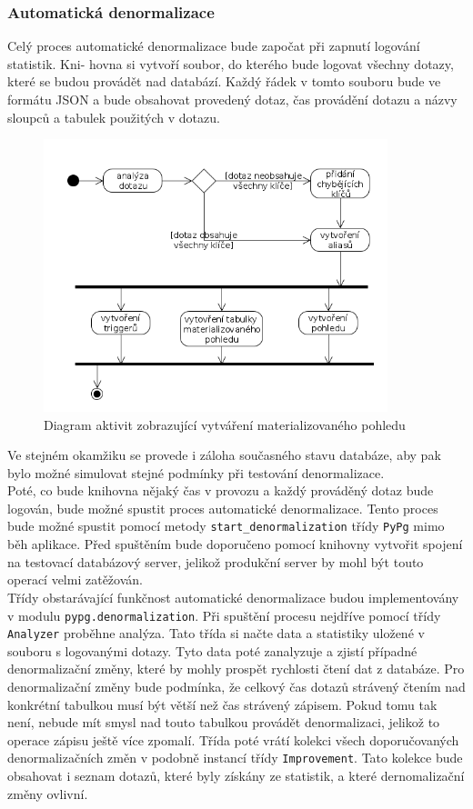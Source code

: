 \documentclass[ing,male,java,dept456]{diploma}						%
\begin{document}
\subsubsection{Automatická denormalizace}

Celý proces automatické denormalizace bude započat při zapnutí logování statistik. Kni- hovna si vytvoří soubor, do kterého bude logovat všechny dotazy, které se budou provádět nad databází. Každý řádek v tomto souboru bude ve formátu JSON a bude obsahovat provedený dotaz, čas provádění dotazu a názvy sloupců a tabulek použitých v dotazu. 
\clearpage
\begin{figure}[h!]
    \centering
    \includegraphics[width=100mm]{matview.png}
    \caption{Diagram aktivit zobrazující vytváření materializovaného pohledu}
    \label{fig:Matview}
\end{figure}
Ve stejném okamžiku se provede i záloha současného stavu databáze, aby pak bylo možné simulovat stejné podmínky při testování denormalizace. \\
Poté, co bude knihovna nějaký čas v provozu a každý prováděný dotaz bude logován, bude možné spustit proces automatické denormalizace. Tento proces bude možné spustit pomocí metody \lstinline[style=inlinepython]|start_denormalization| třídy \lstinline[style=inlinepython]|PyPg| mimo běh aplikace. Před spuštěním bude doporučeno pomocí knihovny vytvořit spojení na testovací databázový server, jelikož produkční server by mohl být touto operací velmi zatěžován. \\
Třídy obstarávající funkčnost automatické denormalizace budou implementovány v modulu \lstinline[style=inlinepython]|pypg.denormalization|. Při spuštění procesu nejdříve pomocí třídy \lstinline[style=inlinepython]|Analyzer| proběhne analýza. Tato třída si načte data a statistiky uložené v souboru s logovanými dotazy. Tyto data poté zanalyzuje a zjistí případné denormalizační změny, které by mohly prospět rychlosti čtení dat z databáze. Pro denormalizační změny bude podmínka, že celkový čas dotazů strávený čtením nad konkrétní tabulkou musí být větší než čas strávený zápisem. Pokud tomu tak není, nebude mít smysl nad touto tabulkou provádět denormalizaci, jelikož to operace zápisu ještě více zpomalí. Třída poté vrátí kolekci všech doporučovaných denormalizačních změn v podobně instancí třídy \lstinline[style=inlinepython]|Improvement|. Tato kolekce bude obsahovat i seznam dotazů, které byly získány ze statistik, a které dernomalizační změny ovlivní. \\
\end{document}
